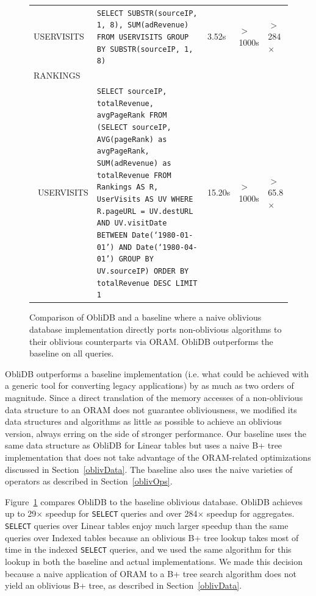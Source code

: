 \documentclass[letterpaper,twocolumn,10pt]{article}
\def\name/{ObliDB}
\begin{document}
\begin{figure}
\begin{tabular}{p{2.2cm} p{8cm} l l l}
USERVISITS & \texttt{SELECT SUBSTR(sourceIP, 1, 8), SUM(adRevenue) FROM USERVISITS GROUP BY SUBSTR(sourceIP, 1, 8)}& 3.52s &$>$1000s & $>$284$\times$\\\rule{0pt}{2ex}
RANKINGS \\\ USERVISITS  & \texttt{SELECT sourceIP, totalRevenue, avgPageRank
FROM
  (SELECT sourceIP,
          AVG(pageRank) as avgPageRank,
          SUM(adRevenue) as totalRevenue
    FROM Rankings AS R, UserVisits AS UV
    WHERE R.pageURL = UV.destURL
       AND UV.visitDate BETWEEN Date(`1980-01-01') AND Date(`1980-04-01')
    GROUP BY UV.sourceIP)
  ORDER BY totalRevenue DESC LIMIT 1} & 15.20s & $>$1000s& $>$65.8$\times$\\
\end{tabular}
\caption{Comparison of \name/ and a baseline where a naive oblivious database implementation directly ports non-oblivious algorithms to their oblivious counterparts via ORAM. \name/ outperforms the baseline on all queries.}
\label{figQueries}
\end{figure}
\name/ outperforms a baseline implementation (i.e. what could be achieved with a generic tool for converting legacy applications) by as much as two orders of magnitude.  Since a direct translation of the memory accesses of a non-oblivious data structure to an ORAM does not guarantee obliviousness, we modified its data structures and algorithms as little as possible to achieve an oblivious version, always erring on the side of stronger performance. Our baseline uses the same data structure as \name/ for Linear tables but uses a naive B+ tree implementation that does not take advantage of the ORAM-related optimizations discussed in Section~\ref{oblivData}. The baseline also uses the naive varieties of operators as described in Section~\ref{oblivOps}.

Figure~\ref{figQueries} compares \name/ to the baseline oblivious database. \name/ achieves up to 29$\times$ speedup for \texttt{SELECT} queries and over 284$\times$ speedup for aggregates. \texttt{SELECT} queries over Linear tables enjoy much larger speedup than the same queries over Indexed tables because an oblivious B+ tree lookup takes most of time in the indexed \texttt{SELECT} queries, and we used the same algorithm for this lookup in both the baseline and actual implementations. We made this decision because a naive application of ORAM to a B+ tree search algorithm does not yield an oblivious B+ tree, as described in Section~\ref{oblivData}.
\end{document}
